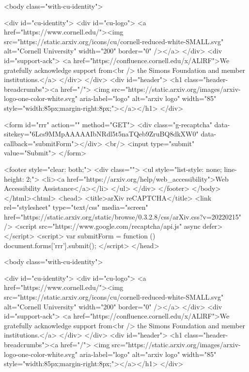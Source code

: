      <body class="with-cu-identity">

       <div id="cu-identity">
         <div id="cu-logo">
           <a href="https://www.cornell.edu/"><img src="https://static.arxiv.org/icons/cu/cornell-reduced-white-SMALL.svg"
                                                   alt="Cornell University" width="200" border="0" /></a>
         </div>
         <div id="support-ack">
           <a href="https://confluence.cornell.edu/x/ALlRF">We gratefully acknowledge support from<br />
             the Simons Foundation and member institutions.</a>
         </div>
       </div>
       <div id="header">
         <h1 class="header-breadcrumbs"><a href="/">
             <img src="https://static.arxiv.org/images/arxiv-logo-one-color-white.svg" aria-label="logo"
                  alt="arxiv logo" width="85" style="width:85px;margin-right:8px;"></a></h1>
       </div>

       <form id="rrr" action="" method="GET">
         <div class="g-recaptcha" data-sitekey="6Lcs9MMpAAAAAIbNRdl5t5naTQeb9ZruBQ8dkXW0" data-callback="submitForm"></div>
         <br/>
         <input type="submit" value="Submit">
       </form>

       <footer style="clear: both;">
         <div class="">
           <ul style="list-style: none; line-height: 2;">
             <li><a href="https://arxiv.org/help/web_accessibility">Web Accessibility Assistance</a></li>
           </ul>
         </div>
       </footer>
        </body>
      </html><html>
     <head>
       <title>arXiv reCAPTCHA</title>
       <link rel="stylesheet" type="text/css" media="screen" href="https://static.arxiv.org/static/browse/0.3.2.8/css/arXiv.css?v=20220215" />
       <script src="https://www.google.com/recaptcha/api.js" async defer></script>
       <script>
         var submitForm = function () {
             document.forms['rrr'].submit();
         }
       </script>
     </head>

     <body class="with-cu-identity">

       <div id="cu-identity">
         <div id="cu-logo">
           <a href="https://www.cornell.edu/"><img src="https://static.arxiv.org/icons/cu/cornell-reduced-white-SMALL.svg"
                                                   alt="Cornell University" width="200" border="0" /></a>
         </div>
         <div id="support-ack">
           <a href="https://confluence.cornell.edu/x/ALlRF">We gratefully acknowledge support from<br />
             the Simons Foundation and member institutions.</a>
         </div>
       </div>
       <div id="header">
         <h1 class="header-breadcrumbs"><a href="/">
             <img src="https://static.arxiv.org/images/arxiv-logo-one-color-white.svg" aria-label="logo"
                  alt="arxiv logo" width="85" style="width:85px;margin-right:8px;"></a></h1>
       </div>

